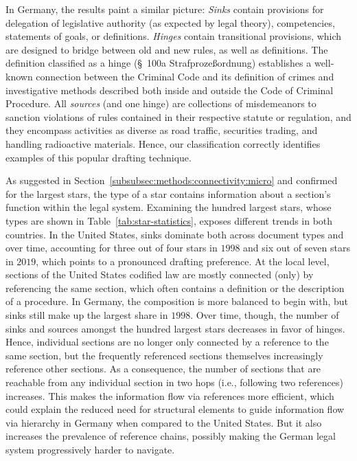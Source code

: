 In Germany, the results paint a similar picture:
\emph{Sinks} contain provisions for delegation of legislative authority (as expected by legal theory), competencies, statements of goals, or definitions.
\emph{Hinges} contain transitional provisions, 
which are designed to bridge between old and new rules, as well as definitions.
The definition classified as a hinge (§~100a Strafprozeßordnung) establishes a well-known connection between the Criminal Code and its definition of crimes and investigative methods described both inside and outside the Code of Criminal Procedure.
All \emph{sources} (and one hinge) are collections of misdemeanors to sanction violations of rules contained in their respective statute or regulation, 
and they encompass activities as diverse as road traffic, securities trading, and handling radioactive materials.
Hence, our classification correctly identifies examples of this popular drafting technique.

As suggested in Section~\ref{subsubsec:methods:connectivity:micro} and confirmed for the largest stars, the type of a star contains information about a section's function within the legal system.
Examining the hundred largest stars, whose types are shown in Table~\ref{tab:star-statistics}, exposes different trends in both countries.
In the United States, sinks dominate both across document types and over time, accounting for three out of four stars in $1998$ and six out of seven stars in $2019$, which points to a pronounced drafting preference.
At the local level, sections of the United States codified law are mostly connected (only) by referencing the same section, which often contains a definition or the description of a procedure.
In Germany, the composition is more balanced to begin with, but sinks still make up the largest share in $1998$. 
Over time, though, the number of sinks and sources amongst the hundred largest stars decreases in favor of hinges. 
Hence, individual sections are no longer only connected by a reference to the same section, but the frequently referenced sections themselves increasingly reference other sections.
As a consequence, the number of sections that are reachable from any individual section in two hops (i.e., following two references) increases.
This makes the information flow via references more efficient, which could explain the reduced need for structural elements to guide information flow via hierarchy in Germany when compared to the United States.
But it also increases the prevalence of reference chains, possibly making the German legal system progressively harder to navigate.

